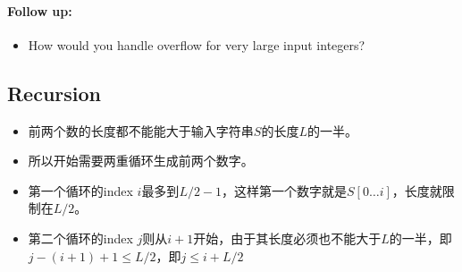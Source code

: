 \paragraph{Follow up:}
\begin{itemize}
\item How would you handle overflow for very large input integers?
\end{itemize}
\subsection{Recursion}
\begin{itemize}
\item 前两个数的长度都不能能大于输入字符串$S$的长度$L$的一半。
\item 所以开始需要两重循环生成前两个数字。
\item 第一个循环的index $i$最多到$L/2-1$，这样第一个数字就是$S[0\ldots i]$，长度就限制在$L/2$。
\item 第二个循环的index $j$则从$i+1$开始，由于其长度必须也不能大于$L$的一半，即$j-(i+1)+1\leq L/2$，即$j\leq i+L/2$
\end{itemize}

